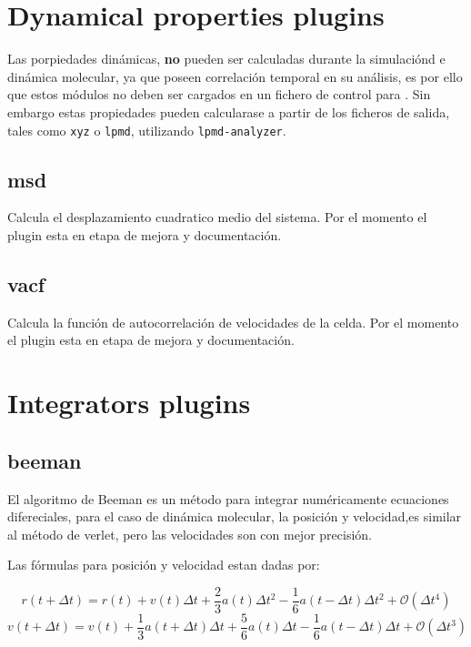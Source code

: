 \section{Dynamical properties plugins}
Las porpiedades din\'amicas, \textbf{no} pueden ser calculadas durante la
simulaci\'ond e din\'amica molecular, ya que poseen correlaci\'on temporal en su
an\'alisis, es por ello que estos m\'odulos no deben ser cargados en un fichero
de control para {\lpmd}. Sin embargo estas propiedades pueden calcularase a
partir de los ficheros de salida, tales como \verb|xyz| o \verb|lpmd|,
utilizando \verb|lpmd-analyzer|.
\subsection{msd}
Calcula el desplazamiento cuadratico medio del sistema. Por el momento el plugin
esta en etapa de mejora y documentaci\'on.
\subsection{vacf}
Calcula la funci\'on de autocorrelaci\'on de velocidades de la celda. Por el
momento el plugin esta en etapa de mejora y documentaci\'on.


\section{Integrators plugins}
\subsection{beeman}
El algoritmo de Beeman es un m\'etodo para integrar num\'ericamente ecuaciones
difereciales, para el caso de din\'amica molecular, la posici\'on y velocidad,es
similar al m\'etodo de verlet, pero las velocidades son con mejor precisi\'on.

Las f\'ormulas para posici\'on y velocidad estan dadas por:

$$r(t+\Delta t) = r(t) + v(t)\Delta t + \frac{2}{3}a(t)\Delta t^2 -
\frac{1}{6}a(t-\Delta t)\Delta t^2 +\mathcal{O}(\Delta t^4)$$
$$v(t+\Delta t) = v(t) + \frac{1}{3}a(t+\Delta t)\Delta t+\frac{5}{6}a(t)\Delta
t-\frac{1}{6}a(t-\Delta t)\Delta t+\mathcal{O}(\Delta t^3)$$

